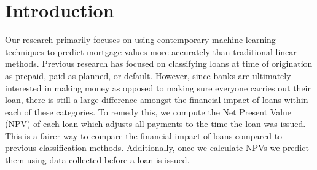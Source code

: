 \documentclass[12 pt]{uncw_thesis}
\theoremstyle{plain}
\theoremstyle{remark}
\theoremstyle{definition}
\begin{document}
\section{Introduction}
\thispagestyle{plain}
Our research primarily focuses on using contemporary machine learning techniques to  predict mortgage values more accurately than traditional linear methods. Previous research has focused on classifying loans at time of origination as prepaid, paid as planned, or default. However, since banks are ultimately interested in making money as opposed to making sure everyone carries out their loan, there is still a large difference amongst the financial impact of loans within each of these categories. To remedy this, we compute the Net Present Value (NPV) of each loan which adjusts all payments to the time the loan was issued. This is a fairer way to compare the financial impact of loans compared to previous classification methods. Additionally, once we calculate NPVs we predict them using data collected before a loan is issued. 
\end{document}
